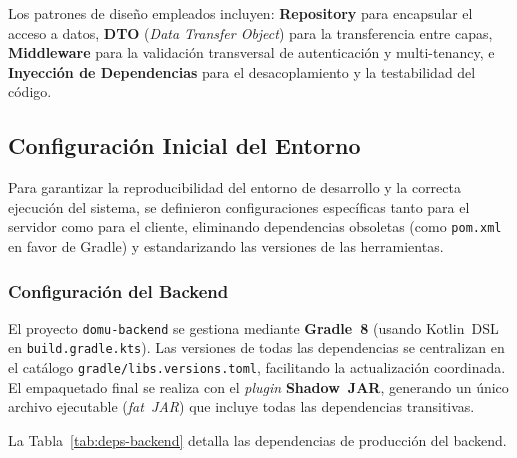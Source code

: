 Los patrones de diseño empleados incluyen: \textbf{Repository} para encapsular el acceso a datos, \textbf{DTO} (\textit{Data Transfer Object}) para la transferencia entre capas, \textbf{Middleware} para la validación transversal de autenticación y multi-tenancy, e \textbf{Inyección de Dependencias} para el desacoplamiento y la testabilidad del código.

\subsection{Configuración Inicial del Entorno}
Para garantizar la reproducibilidad del entorno de desarrollo y la correcta ejecución del sistema, se definieron configuraciones específicas tanto para el servidor como para el cliente, eliminando dependencias obsoletas (como \texttt{pom.xml} en favor de Gradle) y estandarizando las versiones de las herramientas.

\subsubsection*{Configuración del Backend}
El proyecto \texttt{domu-backend} se gestiona mediante \textbf{Gradle~8} (usando Kotlin~DSL en \texttt{build.gradle.kts}). Las versiones de todas las dependencias se centralizan en el catálogo \texttt{gradle/libs.versions.toml}, facilitando la actualización coordinada. El empaquetado final se realiza con el \textit{plugin} \textbf{Shadow~JAR}, generando un único archivo ejecutable (\textit{fat~JAR}) que incluye todas las dependencias transitivas.

La Tabla~\ref{tab:deps-backend} detalla las dependencias de producción del backend.

